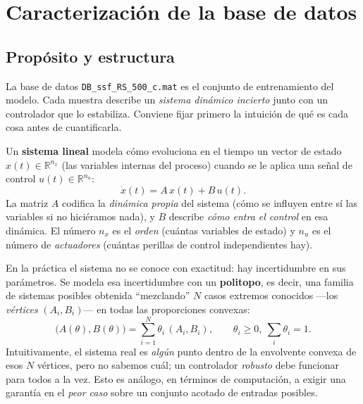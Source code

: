 
\section{Caracterización de la base de datos}
\label{sec:analisis-db}

\subsection{Propósito y estructura}

La base de datos \texttt{DB\_ssf\_RS\_500\_c.mat} es el conjunto de
entrenamiento del modelo. Cada muestra describe un \emph{sistema dinámico
incierto} junto con un controlador que lo estabiliza. Conviene fijar primero la
intuición de qué es cada cosa antes de cuantificarla.

Un \textbf{sistema lineal} modela cómo evoluciona en el tiempo un vector de
estado $x(t)\in\mathbb{R}^{n_x}$ (las variables internas del proceso) cuando se
le aplica una señal de control $u(t)\in\mathbb{R}^{n_u}$:
%
\begin{equation}
  \dot{x}(t) = A\,x(t) + B\,u(t).
  \label{eq:lti}
\end{equation}
%
La matriz $A$ codifica la \emph{dinámica propia} del sistema (cómo se influyen
entre sí las variables si no hiciéramos nada), y $B$ describe \emph{cómo entra
el control} en esa dinámica. El número $n_x$ es el \emph{orden} (cuántas
variables de estado) y $n_u$ es el número de \emph{actuadores} (cuántas
perillas de control independientes hay).

En la práctica el sistema no se conoce con exactitud: hay incertidumbre en sus
parámetros. Se modela esa incertidumbre con un \textbf{politopo}, es decir, una
familia de sistemas posibles obtenida ``mezclando'' $N$ casos extremos
conocidos —los \emph{vértices} $(A_i,B_i)$— en todas las proporciones
convexas:
%
\begin{equation}
  \bigl(A(\theta),B(\theta)\bigr)=\sum_{i=1}^{N}\theta_i\,(A_i,B_i),
  \qquad \theta_i\ge 0,\ \textstyle\sum_i\theta_i=1.
  \label{eq:politopo}
\end{equation}
%
Intuitivamente, el sistema real es \emph{algún} punto dentro de la envolvente
convexa de esos $N$ vértices, pero no sabemos cuál; un controlador
\emph{robusto} debe funcionar para todos a la vez. Esto es análogo, en
términos de computación, a exigir una garantía en el \emph{peor caso} sobre un
conjunto acotado de entradas posibles.

